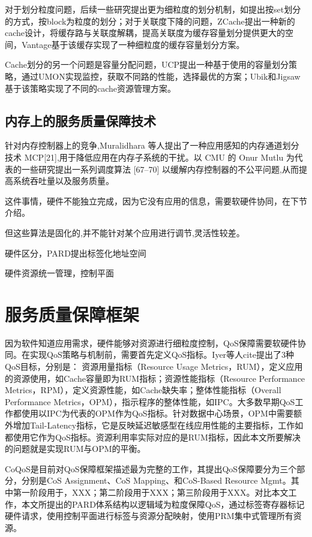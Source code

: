 对于划分粒度问题，后续一些研究提出更为细粒度的划分机制，如\cite{}提出按set划分的方式，\cite{}按block为粒度的划分；对于关联度下降的问题，ZCache\cite{}提出一种新的cache设计，将缓存路与关联度解耦，提高关联度为缓存容量划分提供更大的空间，Vantage\cite{}基于该缓存实现了一种细粒度的缓存容量划分方案。

Cache划分的另一个问题是容量分配问题，UCP提出一种基于使用的容量划分策略，通过UMON实现监控，获取不同路的性能，选择最优的方案；Ubik和Jigsaw基于该策略实现了不同的cache资源管理方案。

\subsection{内存上的服务质量保障技术}

针对内存控制器上的竞争,Muralidhara 等人提出了一种应用感知的内存通道划分技术 MCP[21],用于降低应用在内存子系统的干扰。以 CMU 的 Onur Mutlu 为代表的一些研究提出一系列调度算法 [67–70] 以缓解内存控制器的不公平问题,从而提高系统吞吐量以及服务质量。


这件事情，硬件不能独立完成，因为它没有应用的信息，需要软硬件协同，在下节介绍。

但这些算法是固化的,并不能针对某个应用进行调节,灵活性较差。

硬件区分，PARD提出标签化地址空间

硬件资源统一管理，控制平面


\section{服务质量保障框架}

因为软件知道应用需求，硬件能够对资源进行细粒度控制，QoS保障需要软硬件协同。在实现QoS策略与机制前，需要首先定义QoS指标。Iyer等人cite{}提出了3种QoS目标，分别是： 资源用量指标（Resource Usage Metrics，RUM），定义应用的资源使用，如Cache容量即为RUM指标；资源性能指标（Resource Performance  Metrics，RPM），定义资源性能，如Cache缺失率；整体性能指标（Overall Performance Metrics，OPM），指示程序的整体性能，如IPC。大多数早期QoS工作\cite{}都使用以IPC为代表的OPM作为QoS指标。针对数据中心场景，OPM中需要额外增加Tail-Latency指标，它是反映延迟敏感型在线应用性能的主要指标，工作如\cite{}都使用它作为QoS指标。资源利用率实际对应的是RUM指标，因此本文所要解决的问题就是实现RUM与OPM的平衡。

CoQoS是目前对QoS保障框架描述最为完整的工作，其提出QoS保障要分为三个部分，分别是CoS Assignment、CoS Mapping、和CoS-Based Resource Mgmt。其中第一阶段用于，XXX；第二阶段用于XXX；第三阶段用于XXX。对比本文工作，本文所提出的PARD体系结构以逻辑域为粒度保障QoS，通过标签寄存器标记硬件请求，使用控制平面进行标签与资源分配映射，使用PRM集中式管理所有资源。

